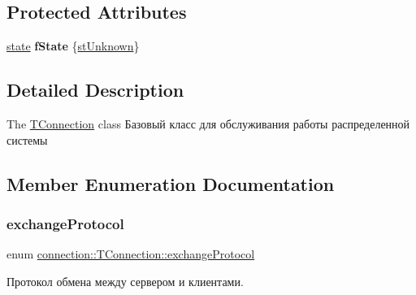 \subsection*{Protected Attributes}
\begin{DoxyCompactItemize}
\item 
\mbox{\label{classconnection_1_1_t_connection_aa55714bb2a9a2b9330b2fd81f7a47f17}} 
\hyperlink{classconnection_1_1_t_connection_aee7dfb7510592bd2697ab6f906b9612c}{state} {\bfseries f\+State} \{\hyperlink{classconnection_1_1_t_connection_aee7dfb7510592bd2697ab6f906b9612ca8ab66af10a4d089e45c493a28df001e4}{st\+Unknown}\}
\end{DoxyCompactItemize}


\subsection{Detailed Description}
The \hyperlink{classconnection_1_1_t_connection}{T\+Connection} class Базовый класс для обслуживания работы распределенной системы 

\subsection{Member Enumeration Documentation}
\mbox{\label{classconnection_1_1_t_connection_a3550181cb2fa72eccfa55d23f45cea34}} 
\subsubsection{\texorpdfstring{exchange\+Protocol}{exchangeProtocol}}
{\footnotesize\ttfamily enum \hyperlink{classconnection_1_1_t_connection_a3550181cb2fa72eccfa55d23f45cea34}{connection\+::\+T\+Connection\+::exchange\+Protocol}}



Протокол обмена между сервером и клиентами. 

